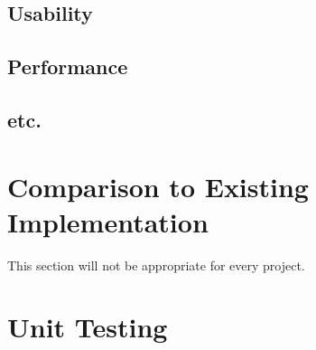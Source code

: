\documentclass[12pt, titlepage]{article}
\begin{document}
\subsection{Usability}
		
\subsection{Performance}

\subsection{etc.}
	
\section{Comparison to Existing Implementation}	

This section will not be appropriate for every project.

\section{Unit Testing}
\end{document}

